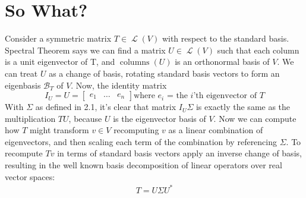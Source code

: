 \documentclass[letterpaper,12pt]{article}
\newcommand{\linearoperator}[1]{\operatorname{\mathcal{L}}(#1)}
\begin{document}
\section{So What?}
Consider a symmetric matrix $T \in \linearoperator{V}$ with respect to the standard basis. Spectral Theorem says we can find a matrix $U \in \linearoperator{V}$ such that each column is a unit eigenvector of T, and $\operatorname{columns}(U)$ is an orthonormal basis of $V$. We can treat $U$ as a change of basis, rotating standard basis vectors to form an eigenbasis $\mathcal{B}_{T}$ of $V$. Now, the identity matrix
\[
I_U = U=
\begin{bmatrix}
e_1 & \dots & e_n
\end{bmatrix}
\text{where $e_i$ = the $i$'th eigenvector of $T$}
\]
With $\Sigma$ as defined in 2.1, it's clear that matrix $I_U \Sigma$ is exactly the same as the multiplication $TU$, because $U$ is the eigenvector basis of $V$. Now we can compute how $T$ might transform $v \in V$ recomputing $v$ as a linear combination of eigenvectors, and then scaling each term of the combination by referencing $\Sigma$. To recompute $Tv$ in terms of standard basis vectors apply an inverse change of basis, resulting in the well known basis decomposition of linear operators over real vector spaces:
\begin{align*}
    T = U\Sigma U^{*}
\end{align*}
\end{document}
